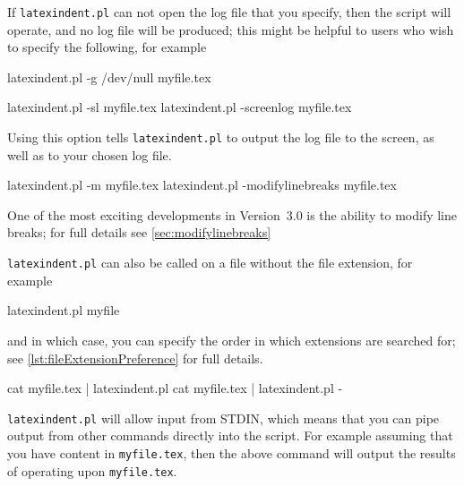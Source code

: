   If \texttt{latexindent.pl} can not open
 the log file that you specify, then the script will operate, and no log file will be
 produced; this might be helpful to users who wish to specify the following, for example

 \begin{commandshell}
latexindent.pl -g /dev/null myfile.tex
\end{commandshell}


 \begin{commandshell}
latexindent.pl -sl myfile.tex
latexindent.pl -screenlog myfile.tex
\end{commandshell}

 Using this  option tells
 \texttt{latexindent.pl} to output the log file to the screen, as well as to your chosen
 log file.%


 \begin{commandshell}
latexindent.pl -m myfile.tex
latexindent.pl -modifylinebreaks myfile.tex
\end{commandshell}

 One of the most exciting developments in Version~3.0 is the ability to modify line
 breaks; for full details see \vref{sec:modifylinebreaks}

 \texttt{latexindent.pl} can also be called on a file without the file extension, for
 example

 \begin{commandshell}
latexindent.pl myfile
\end{commandshell}

 and in which case, you can specify the order in which extensions are searched for; see
 \vref{lst:fileExtensionPreference} for full details. 

 \begin{commandshell}
cat myfile.tex | latexindent.pl
cat myfile.tex | latexindent.pl -
\end{commandshell}

 \texttt{latexindent.pl} will%
  allow input from STDIN, which means that you can
 pipe output from other commands directly into the script. For example assuming that you
 have content in \texttt{myfile.tex}, then the above command will output the results of
 operating upon \texttt{myfile.tex}.

